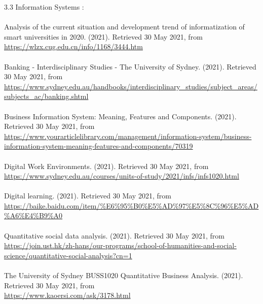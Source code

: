 \documentclass{article}
\begin{document}
	3.3 Information Systems : \\
	\\
	Analysis of the current situation and development trend of informatization of smart universities in 2020. (2021). Retrieved 30 May 2021, from \\
	\url{https://wlzx.cug.edu.cn/info/1168/3444.htm }\\
	\\
	Banking - Interdisciplinary Studies - The University of Sydney. (2021). Retrieved 30 May 2021, from \\
	\url{https://www.sydney.edu.au/handbooks/interdisciplinary_studies/subject_areas/subjects_ac/banking.shtml }\\
	\\
	Business Information System: Meaning, Features and Components. (2021). Retrieved 30 May 2021, from \\
	\url{https://www.yourarticlelibrary.com/management/information-system/business-information-system-meaning-features-and-components/70319 }\\
	\\
	Digital Work Environments. (2021). Retrieved 30 May 2021, from \\
	\url{ https://www.sydney.edu.au/courses/units-of-study/2021/infs/infs1020.html }\\
	\\
	Digital learning. (2021). Retrieved 30 May 2021, from\\
	\url{ https://baike.baidu.com/item/%E6%95%B0%E5%AD%97%E5%8C%96%E5%AD%A6%E4%B9%A0 } \\
	\\
	Quantitative social data analysis. (2021). Retrieved 30 May 2021, from \\
	\url{ https://join.ust.hk/zh-hans/our-programs/school-of-humanities-and-social-science/quantitative-social-analysis?cn=1 } \\
	\\
	The University of Sydney BUSS1020 Quantitative Business Analysis. (2021). Retrieved 30 May 2021, from \\
	\url{https://www.kaoersi.com/ask/3178.html }\\
	\\
	
\end{document}

